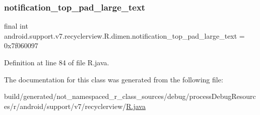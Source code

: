 \subsubsection{\texorpdfstring{notification\_top\_pad\_large\_text}{notification\_top\_pad\_large\_text}}
{\footnotesize\ttfamily final int android.\+support.\+v7.\+recyclerview.\+R.\+dimen.\+notification\+\_\+top\+\_\+pad\+\_\+large\+\_\+text = 0x7f060097\hspace{0.3cm}{\ttfamily [static]}}



Definition at line 84 of file R.\+java.



The documentation for this class was generated from the following file\+:\begin{DoxyCompactItemize}
\item 
build/generated/not\+\_\+namespaced\+\_\+r\+\_\+class\+\_\+sources/debug/process\+Debug\+Resources/r/android/support/v7/recyclerview/\mbox{\hyperlink{android_2support_2v7_2recyclerview_2_r_8java}{R.\+java}}\end{DoxyCompactItemize}

